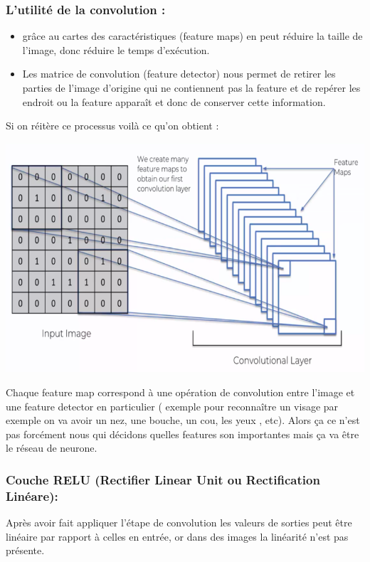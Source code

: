 \subsubsection{L’utilité de la convolution : }
\begin{itemize}
\item grâce au cartes des caractéristiques (feature maps) en peut réduire la taille de l’image, donc réduire le temps d’exécution.
\item Les matrice de convolution (feature detector) nous permet de retirer les parties de l’image d’origine qui ne contiennent pas la feature et de repérer les endroit ou la feature apparaît et donc de conserver cette information.
\end{itemize}


Si on réitère ce processus voilà ce qu’on obtient :\\

\begin{center}
	\includegraphics[scale=0.3]{img11.png}
\end{center}

Chaque feature map  correspond à une opération de convolution entre l’image et une  feature detector en particulier ( exemple pour reconnaître un visage par exemple on va avoir un nez, une bouche, un cou, les yeux , etc). Alors ça ce n’est pas forcément nous qui décidons quelles features son importantes mais ça va être le réseau de neurone.

\subsubsection{Couche RELU (Rectifier Linear Unit ou Rectification Linéare):}
Après avoir fait appliquer l’étape de convolution les valeurs de sorties peut être linéaire par rapport à celles en entrée, or dans des images la linéarité n’est pas présente.\\

